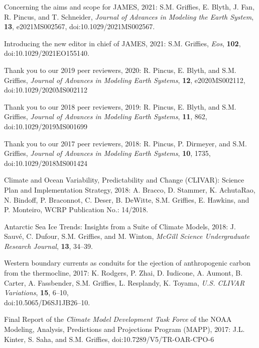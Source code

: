 \begin{etaremune}
\item Concerning the aims and scope for JAMES, 2021: S.M. Grif\/f\/ies, E. Blyth, J. Fan, R. Pincus, and T. Schneider, {\it Journal of Advances in Modeling the Earth System}, {\bf 13},  e2021MS002567, doi:10.1029/2021MS002567.

\item Introducing the new editor in chief of JAMES, 2021: S.M. Grif\/f\/ies, {\it Eos}, {\bf 102}, doi:10.1029/2021EO155140. 

\item Thank you to our 2019 peer reviewers, 2020: R. Pincus, E. Blyth, and S.M. Grif\/f\/ies, {\it Journal of Advances in Modeling Earth Systems}, {\bf 12}, e2020MS002112, doi:10.1029/2020MS002112

\item Thank you to our 2018 peer reviewers, 2019: R. Pincus, E. Blyth, and S.M. Grif\/f\/ies, {\it Journal of Advances in Modeling Earth Systems}, {\bf 11}, 862, doi:10.1029/2019MS001699

\item  Thank you to our 2017 peer reviewers, 2018:  R. Pincus, P. Dirmeyer, and S.M. Grif\/f\/ies, {\it Journal of Advances in Modeling Earth Systems}, {\bf 10}, 1735, doi:10.1029/2018MS001424

\item Climate and Ocean Variability, Predictability and Change (CLIVAR): Science Plan and Implementation Strategy, 2018: A. Bracco, D. Stammer, K. AchutaRao, N. Bindoff, P. Braconnot, C. Deser, B. DeWitte, S.M. Grif\/f\/ies, E. Hawkins, and P. Monteiro, WCRP Publication No.: 14/2018. 

\item Antarctic Sea Ice Trends: Insights from a Suite of Climate Models, 2018: J. Sauv\'{e}, C. Dufour, S.M. Grif\/f\/ies, and M. Winton, {\it McGill Science Undergraduate Research Journal}, {\bf 13}, 34--39. 

\item Western boundary currents as conduits for the ejection of anthropogenic carbon from the thermocline, 2017: K. Rodgers, P. Zhai, D. Iudicone, A. Aumont, B. Carter, A. Fassbender, S.M. Grif\/f\/ies, L. Resplandy, K. Toyama, {\it U.S. CLIVAR Variations}, {\bf 15}, 6--10, \\ doi:10.5065/D6SJ1JB26--10.

\item Final Report of the {\it Climate Model Development Task Force} of the NOAA Modeling, Analysis, Predictions and Projections Program (MAPP), 2017: J.L. Kinter, S. Saha, and S.M. Grif\/fies, doi:10.7289/V5/TR-OAR-CPO-6


\end{etaremune}
